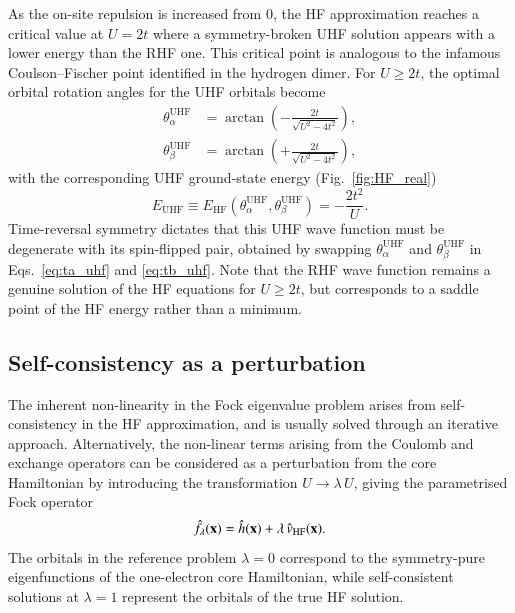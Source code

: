 \documentclass[aps,prb,reprint,noshowkeys,superscriptaddress]{revtex4-1}
\newcommand{\hugh}[1]{\textcolor{hughgreen}{#1}}
\newcommand{\ta}{\theta_{\alpha}}
\newcommand{\tb}{\theta_{\beta}}
\begin{document}
As the on-site repulsion is increased from 0, the HF approximation reaches a critical value at $U=2t$ where a symmetry-broken 
UHF solution appears with a lower energy than the RHF one.
This critical point is analogous to the infamous Coulson--Fischer point identified in the hydrogen dimer.\cite{Coulson_1949}
For $U \ge 2t$, the optimal orbital rotation angles for the UHF orbitals become
\begin{align}
    \ta^\text{UHF} & = \arctan (-\frac{2t}{\sqrt{U^2 - 4t^2}}),
    \label{eq:ta_uhf}
	\\
    \tb^\text{UHF} & = \arctan (+\frac{2t}{\sqrt{U^2 - 4t^2}}),
    \label{eq:tb_uhf}
\end{align}
with the corresponding UHF ground-state energy (Fig.~\ref{fig:HF_real})
\begin{equation}
	E_\text{UHF} \equiv E_\text{HF}(\ta^\text{UHF}, \tb^\text{UHF}) = - \frac{2t^2}{U}.
\end{equation}
Time-reversal symmetry dictates that this UHF wave function must be degenerate with its spin-flipped pair, obtained 
by swapping $\ta^{\text{UHF}}$ and $\tb^{\text{UHF}}$ in Eqs.~\eqref{eq:ta_uhf} and \eqref{eq:tb_uhf}.
Note that the RHF wave function remains a genuine solution of the HF equations for $U \ge 2t$, but corresponds to a saddle point 
of the HF energy rather than a minimum.

\subsection{Self-consistency as a perturbation} %

\hugh{The inherent non-linearity in the Fock eigenvalue problem arises from self-consistency 
in the HF approximation, and is usually solved through an iterative approach.\cite{SzaboBook}
Alternatively, the non-linear terms arising from the Coulomb and exchange operators can 
be considered as a perturbation from the core Hamiltonian by introducing the
transformation $U \rightarrow \lambda\, U$, giving the parametrised Fock operator 
\begin{equation}
    \Hat{f}_{\lambda}(\vb{x}) = \Hat{h}(\vb{x}) + \lambda\, \Hat{v}_\text{HF}(\vb{x}).
\end{equation}
The orbitals in the reference problem $\lambda=0$ correspond to the symmetry-pure eigenfunctions of the one-electron core
Hamiltonian, while self-consistent solutions at $\lambda = 1$ represent the orbitals of the true HF solution.}
\end{document}
